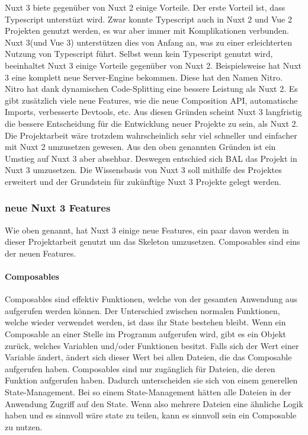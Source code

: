 Nuxt 3 biete gegenüber von Nuxt 2 einige Vorteile. Der erste Vorteil ist, dass Typescript unterstüzt wird. Zwar konnte Typescript auch in Nuxt 2 und Vue 2 Projekten genutzt werden, es war aber immer mit Komplikationen verbunden. Nuxt 3(und Vue 3) unterstützen dies von Anfang an, was zu einer erleichterten Nutzung von Typescript führt. Selbst wenn kein Typescript genutzt wird, beeinhaltet Nuxt 3 einige Vorteile gegenüber von Nuxt 2. Beispielsweise hat Nuxt 3 eine komplett neue Server-Engine bekommen. Diese hat den Namen Nitro. Nitro hat dank dynamischen Code-Splitting eine bessere Leistung als Nuxt 2. Es gibt zusätzlich viele neue Features, wie die neue Composition API, automatische Imports, verbesserte Devtools, etc. Aus diesen Gründen scheint Nuxt 3 langfristig die bessere Entscheidung für die Entwicklung neuer Projekte zu sein, als Nuxt 2. Die Projektarbeit wäre trotzdem wahrscheinlich sehr viel schneller und einfacher mit Nuxt 2 umzusetzen gewesen. Aus den oben genannten Gründen ist ein Umstieg auf Nuxt 3 aber absehbar. Deswegen entschied sich \acs{BAL} das Projekt in Nuxt 3 umzusetzen. Die Wissensbasis von Nuxt 3 soll mithilfe des Projektes erweitert und der Grundstein für zukünftige Nuxt 3 Projekte gelegt werden.

\subsubsection{neue Nuxt 3 Features}
\label{sec:neue Nuxt 3 Features}

Wie oben genannt, hat Nuxt 3 einige neue Features, ein paar davon werden in dieser Projektarbeit genutzt um das Skeleton umzusetzen. Composables sind eins der neuen Features.

\paragraph{Composables}

Composables sind effektiv Funktionen, welche von der gesamten Anwendung aus aufgerufen werden können. Der Unterschied zwischen normalen Funktionen, welche wieder verwendet werden, ist dass ihr State bestehen bleibt. Wenn ein Composable an einer Stelle im Programm aufgerufen wird, gibt es ein Objekt zurück, welches Variablen und/oder Funktionen besitzt. Falls sich der Wert einer Variable ändert, ändert sich dieser Wert bei allen Dateien, die das Composable aufgerufen haben. Composables sind nur zugänglich für Dateien, die deren Funktion aufgerufen haben. Dadurch unterscheiden sie sich von einem generellen State-Management. Bei so einem State-Management hätten alle Dateien in der Anwendung Zugriff auf den State. Wenn also mehrere Dateien eine ähnliche Logik haben und es sinnvoll wäre state zu teilen, kann es sinnvoll sein ein Composable zu nutzen.

